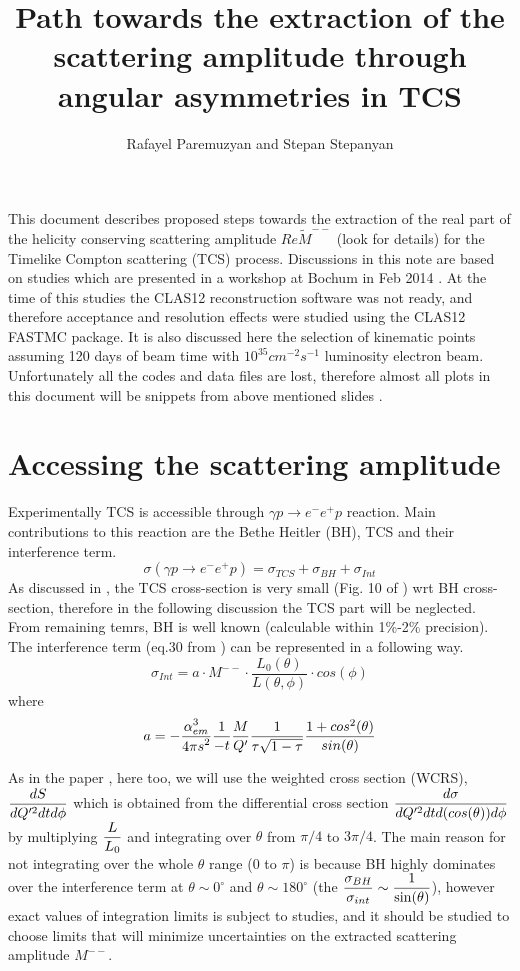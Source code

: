 \documentclass[letterpaper,12pt]{article}
\title{Path towards the extraction of the scattering amplitude through angular asymmetries in TCS}
\author{Rafayel Paremuzyan and Stepan Stepanyan}
\def \rarr {\rightarrow}
\def\dfrac#1#2{\displaystyle{{#1}\over{#2}}}
\def \dstl {\displaystyle}
\begin{document}
 
 \maketitle
 
 This document describes proposed steps towards the extraction of the real part of the helicity conserving scattering amplitude $Re\tilde{M}^{--}$ (look \cite{Berger:2001xd} for details) for the Timelike Compton scattering (TCS) process. Discussions in this note are based on studies which are presented in a workshop at Bochum in Feb 2014 \cite{Bochum_TCS}. At the time of this studies the CLAS12 reconstruction software was not ready, and therefore acceptance and resolution effects were studied using the CLAS12 FASTMC package. It is also discussed here the selection of kinematic points assuming 120 days of beam time with $10^{35}cm^{-2}s^{-1}$ luminosity electron beam. 
 Unfortunately all the codes and data files are lost, therefore almost all plots in this document will be snippets from above mentioned slides \cite{Bochum_TCS}.
 
 \section{Accessing the scattering amplitude}
 Experimentally TCS is accessible through $\gamma p \rarr e^{-}e^{+}p$ reaction. Main contributions to this reaction are the Bethe Heitler (BH), TCS and their interference term.
 \begin{equation}
 \sigma(\gamma p \rarr e^{-}e^{+}p) = \sigma_{TCS} + \sigma_{BH} + \sigma_{Int}
 \end{equation}
As discussed in \cite{Berger:2001xd}, the TCS cross-section is very small (Fig. 10 of \cite{Berger:2001xd}) wrt BH cross-section, therefore in the following discussion the TCS part will be neglected. From remaining temrs, BH is well known (calculable within 1\%-2\% precision). The interference term (eq.30 from \cite{Berger:2001xd})
can be represented in a following way.
\begin{equation}
 \sigma_{Int} = a\cdot M^{--} \cdot \frac{L_{0}(\theta)}{L(\theta, \phi)} \cdot cos(\phi)
\end{equation}
where 
\begin{equation}
a = - \frac{\dstl \alpha_{em}^{3}}{\dstl 4\pi s^{2}} \dfrac{1}{-t}\dfrac{M}{Q^{\prime}}
\dfrac{1}{\tau\sqrt{1-\tau}}\dfrac{1 + cos^{2}(\theta)}{sin(\theta)}
\end{equation}

 
As in the paper \cite{Berger:2001xd}, here too, we will use the weighted cross section (WCRS),
$\dfrac{dS}{dQ^{\prime 2} dt d\phi}$ which is obtained from the differential cross section $\dfrac{d\sigma}{dQ^{\prime 2}dt d(cos(\theta))d\phi}$ by multiplying $\dfrac{L}{L_{0}}$ and integrating over $\theta$ from $\pi/4$ to $3\pi/4$. The main reason for not integrating over the whole $\theta$ range ($0$ to $\pi$) is because BH highly dominates over the interference term at $\theta \sim 0^{\circ}$ and $\theta \sim 180^{\circ}$ (the $\dfrac{\sigma_{BH}}{\sigma_{int}}\sim \dfrac{1}{\sin(\theta)}$), however exact values of integration limits is subject to studies, and it should be studied to choose limits that will minimize uncertainties on the extracted scattering amplitude $M^{--}$.
 
\end{document}
